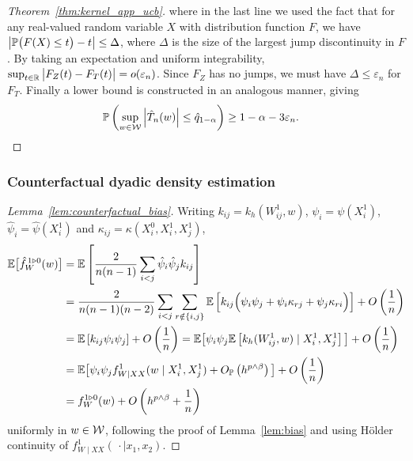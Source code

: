 \begin{proof}[Theorem~\ref{thm:kernel_app_ucb}]
  where in the last line we used the fact that for any
  real-valued random variable $X$ with distribution function $F$,
  we have
  $\big|\P\big(F(X) \leq t\big) - t\big| \leq \Delta$,
  where $\Delta$ is the size of the
  largest jump discontinuity in $F$.
  By taking an expectation and uniform integrability,
  $\sup_{t \in \R} \big| F_Z(t) - F_T(t) \big| = o(\varepsilon_n)$.
  Since $F_Z$ has no jumps,
  we must have $\Delta \leq \varepsilon_n$ for $F_T$.
  Finally a lower bound is constructed in an analogous manner,
  giving
  \begin{align*}
    \P\left(
      \sup_{w \in \cW}
      \left| \hat T_n(w) \right|
      \leq
      \hat q_{1-\alpha}
    \right)
    &\geq
    1 - \alpha - 3\varepsilon_n.
  \end{align*}
\end{proof}

\subsubsection{Counterfactual dyadic density estimation}
\begin{proof}[Lemma~\ref{lem:counterfactual_bias}]

  Writing
  $k_{i j} = k_h(W_{i j}^1, w)$,
  $\psi_i = \psi(X_i^1)$,
  $\hat\psi_i = \hat\psi(X_i^1)$
  and $\kappa_{i j} = \kappa(X_i^0, X_i^1, X_j^1)$,
  \begin{align*}
    \E\big[\hat f_W^{\,1 \triangleright 0}(w)\big]
    &=
    \E\left[
      \frac{2}{n(n-1)}
      \sum_{i<j}
      \hat \psi_i
      \hat \psi_j
      k_{i j}
    \right] \\
    &=
    \frac{2}{n(n-1)(n-2)}
    \sum_{i < j}
    \sum_{r \notin \{i,j\}}
    \E\left[
      k_{i j}
      \Big(
        \psi_i
        \psi_j
        +\psi_i
        \kappa_{r j}
        +\psi_j
        \kappa_{r i}
      \Big)
    \right]
    + O\left(\frac{1}{n}\right) \\
    &=
    \E\left[
      k_{i j}
      \psi_i
      \psi_j
    \right]
    + O\left(\frac{1}{n}\right)
    =
    \E\big[
      \psi_i
      \psi_j
      \E\left[
        k_h(W_{i j}^1, w)
        \mid X_i^1, X_j^1
      \right]
    \big]
    + O\left(\frac{1}{n}\right) \\
    &=
    \E\big[
      \psi_i
      \psi_j
      f_{W \mid XX}^1(w \mid X_i^1, X_j^1)
      + O_\P\left( h^{p \wedge \beta} \right)
    \big]
    + O\left(\frac{1}{n}\right) \\
    &=
    f_W^{1 \triangleright 0}(w)
    + O\left( h^{p \wedge \beta} + \frac{1}{n}\right)
  \end{align*}
  uniformly in $w \in \cW$, following the proof of
  Lemma~\ref{lem:bias} and using H{\"o}lder continuity
  of $f_{W \mid XX}^1(\,\cdot \mid x_1, x_2)$.
\end{proof}

